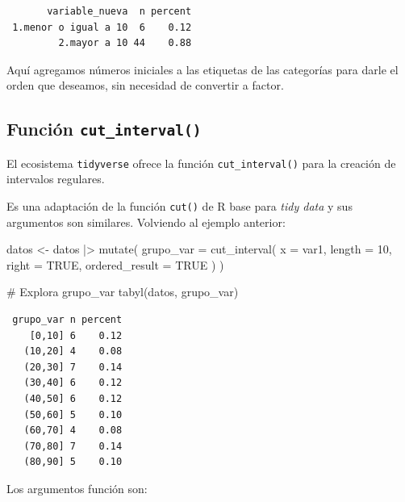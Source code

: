 \documentclass[
  spanish,
  a4paper,
]{scrbook}
\newenvironment{Shaded}{\begin{snugshade}}{\end{snugshade}}
\newcommand{\AttributeTok}[1]{\textcolor[rgb]{0.40,0.45,0.13}{#1}}
\newcommand{\CommentTok}[1]{\textcolor[rgb]{0.37,0.37,0.37}{#1}}
\newcommand{\ConstantTok}[1]{\textcolor[rgb]{0.56,0.35,0.01}{#1}}
\newcommand{\DecValTok}[1]{\textcolor[rgb]{0.68,0.00,0.00}{#1}}
\newcommand{\FunctionTok}[1]{\textcolor[rgb]{0.28,0.35,0.67}{#1}}
\newcommand{\NormalTok}[1]{\textcolor[rgb]{0.00,0.23,0.31}{#1}}
\newcommand{\OtherTok}[1]{\textcolor[rgb]{0.00,0.23,0.31}{#1}}
\newcommand{\SpecialCharTok}[1]{\textcolor[rgb]{0.37,0.37,0.37}{#1}}
\begin{document}
\begin{verbatim}
       variable_nueva  n percent
 1.menor o igual a 10  6    0.12
         2.mayor a 10 44    0.88
\end{verbatim}

Aquí agregamos números iniciales a las etiquetas de las categorías para
darle el orden que deseamos, sin necesidad de convertir a factor.

\subsection{\texorpdfstring{Función
\textbf{\texttt{cut\_interval()}}}{Función cut\_interval()}}\label{funciuxf3n-cut_interval}

El ecosistema \texttt{tidyverse} ofrece la función
\texttt{cut\_interval()} para la creación de intervalos regulares.

Es una adaptación de la función \texttt{cut()} de R base para \emph{tidy
data} y sus argumentos son similares. Volviendo al ejemplo anterior:

\begin{Shaded}
\begin{Highlighting}[]
\NormalTok{datos }\OtherTok{\textless{}{-}}\NormalTok{ datos }\SpecialCharTok{|\textgreater{}}
  \FunctionTok{mutate}\NormalTok{(}
    \AttributeTok{grupo\_var =} \FunctionTok{cut\_interval}\NormalTok{(}
      \AttributeTok{x =}\NormalTok{ var1,}
      \AttributeTok{length =} \DecValTok{10}\NormalTok{,}
      \AttributeTok{right =} \ConstantTok{TRUE}\NormalTok{,}
      \AttributeTok{ordered\_result =} \ConstantTok{TRUE}
\NormalTok{    )}
\NormalTok{  )}

\CommentTok{\# Explora grupo\_var}
\FunctionTok{tabyl}\NormalTok{(datos, grupo\_var)}
\end{Highlighting}
\end{Shaded}

\begin{verbatim}
 grupo_var n percent
    [0,10] 6    0.12
   (10,20] 4    0.08
   (20,30] 7    0.14
   (30,40] 6    0.12
   (40,50] 6    0.12
   (50,60] 5    0.10
   (60,70] 4    0.08
   (70,80] 7    0.14
   (80,90] 5    0.10
\end{verbatim}

Los argumentos función son:
\end{document}
